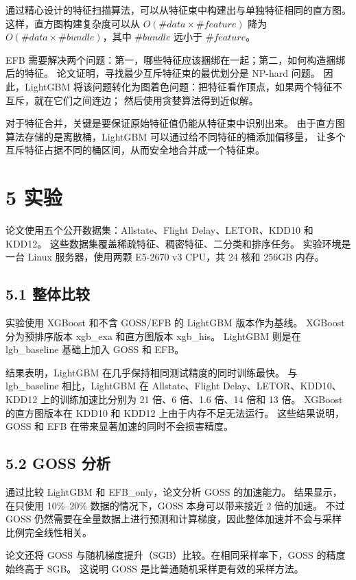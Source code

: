 通过精心设计的特征扫描算法，可以从特征束中构建出与单独特征相同的直方图。
这样，直方图构建复杂度可以从
$O(\#data\times \#feature)$ 降为
$O(\#data\times \#bundle)$，其中 $\#bundle$ 远小于 $\#feature$。

EFB 需要解决两个问题：第一，哪些特征应该捆绑在一起；第二，如何构造捆绑后的特征。
论文证明，寻找最少互斥特征束的最优划分是 NP-hard 问题。
因此，LightGBM 将该问题转化为图着色问题：把特征看作顶点，如果两个特征不互斥，就在它们之间连边；
然后使用贪婪算法得到近似解。

对于特征合并，关键是要保证原始特征值仍能从特征束中识别出来。
由于直方图算法存储的是离散桶，LightGBM 可以通过给不同特征的桶添加偏移量，
让多个互斥特征占据不同的桶区间，从而安全地合并成一个特征束。

\section{5 实验}

论文使用五个公开数据集：Allstate、Flight Delay、LETOR、KDD10 和 KDD12。
这些数据集覆盖稀疏特征、稠密特征、二分类和排序任务。
实验环境是一台 Linux 服务器，使用两颗 E5-2670 v3 CPU，共 24 核和 256GB 内存。

\subsection{5.1 整体比较}

实验使用 XGBoost 和不含 GOSS/EFB 的 LightGBM 版本作为基线。
XGBoost 分为预排序版本 xgb\_exa 和直方图版本 xgb\_his。
LightGBM 则是在 lgb\_baseline 基础上加入 GOSS 和 EFB。

结果表明，LightGBM 在几乎保持相同测试精度的同时训练最快。
与 lgb\_baseline 相比，LightGBM 在 Allstate、Flight Delay、LETOR、KDD10、KDD12
上的训练加速比分别为 21 倍、6 倍、1.6 倍、14 倍和 13 倍。
XGBoost 的直方图版本在 KDD10 和 KDD12 上由于内存不足无法运行。
这些结果说明，GOSS 和 EFB 在带来显著加速的同时不会损害精度。

\subsection{5.2 GOSS 分析}

通过比较 LightGBM 和 EFB\_only，论文分析 GOSS 的加速能力。
结果显示，在只使用 10\%--20\% 数据的情况下，GOSS 本身可以带来接近 2 倍的加速。
不过 GOSS 仍然需要在全量数据上进行预测和计算梯度，因此整体加速并不会与采样比例完全线性相关。

论文还将 GOSS 与随机梯度提升（SGB）比较。在相同采样率下，GOSS 的精度始终高于 SGB。
这说明 GOSS 是比普通随机采样更有效的采样方法。

